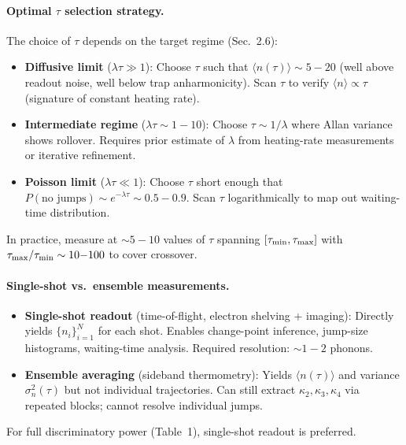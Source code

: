 \paragraph{Optimal $\tau$ selection strategy.}
The choice of $\tau$ depends on the target regime (Sec.~2.6):
\begin{itemize}
\item \textbf{Diffusive limit} ($\lambda \tau \gg 1$): 
  Choose $\tau$ such that $\langle n(\tau) \rangle \sim 5{-}20$ 
  (well above readout noise, well below trap anharmonicity). 
  Scan $\tau$ to verify $\langle n \rangle \propto \tau$ (signature of constant heating rate).

\item \textbf{Intermediate regime} ($\lambda \tau \sim 1{-}10$): 
  Choose $\tau \sim 1/\lambda$ where Allan variance shows rollover. 
  Requires prior estimate of $\lambda$ from heating-rate measurements 
  or iterative refinement.

\item \textbf{Poisson limit} ($\lambda \tau \ll 1$): 
  Choose $\tau$ short enough that $P(\text{no jumps}) \sim e^{-\lambda\tau} \sim 0.5{-}0.9$. 
  Scan $\tau$ logarithmically to map out waiting-time distribution.
\end{itemize}
In practice, measure at $\sim 5{-}10$ values of $\tau$ spanning $[\tau_{\rm min}, \tau_{\rm max}]$ 
with $\tau_{\rm max}/\tau_{\rm min} \sim 10{-}100$ to cover crossover.

\paragraph{Single-shot vs.\ ensemble measurements.}
\begin{itemize}
\item \textbf{Single-shot readout} (time-of-flight, electron shelving + imaging): 
  Directly yields $\{n_i\}_{i=1}^N$ for each shot. 
  Enables change-point inference, jump-size histograms, waiting-time analysis. 
  Required resolution: $\sim 1{-}2$ phonons.

\item \textbf{Ensemble averaging} (sideband thermometry): 
  Yields $\langle n(\tau) \rangle$ and variance $\sigma_n^2(\tau)$ 
  but not individual trajectories. 
  Can still extract $\kappa_2, \kappa_3, \kappa_4$ via repeated blocks; 
  cannot resolve individual jumps.
\end{itemize}
For full discriminatory power (Table~1), single-shot readout is preferred.

